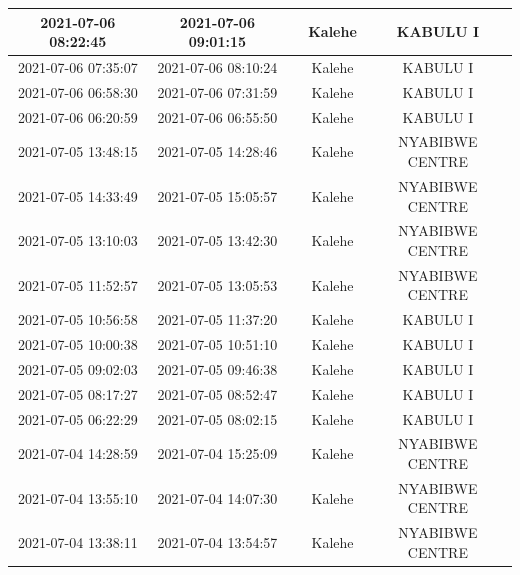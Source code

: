 \documentclass[
]{book}
\begin{document}
\begin{table}
\begin{tabular}[t]{c|c|>{}c|c|c}
\hline
2021-07-06 08:22:45 & 2021-07-06 09:01:15 & \cellcolor[HTML]{365D8D}{\textcolor{white}{39}} & Kalehe & KABULU I\\
\hline
2021-07-06 07:35:07 & 2021-07-06 08:10:24 & \cellcolor[HTML]{1F988B}{\textcolor{white}{35}} & Kalehe & KABULU I\\
\hline
2021-07-06 06:58:30 & 2021-07-06 07:31:59 & \cellcolor[HTML]{277E8E}{\textcolor{white}{33}} & Kalehe & KABULU I\\
\hline
2021-07-06 06:20:59 & 2021-07-06 06:55:50 & \cellcolor[HTML]{218E8D}{\textcolor{white}{35}} & Kalehe & KABULU I\\
\hline
2021-07-05 13:48:15 & 2021-07-05 14:28:46 & \cellcolor[HTML]{FDE725}{\textcolor{white}{41}} & Kalehe & NYABIBWE CENTRE\\
\hline
2021-07-05 14:33:49 & 2021-07-05 15:05:57 & \cellcolor[HTML]{2A788E}{\textcolor{white}{32}} & Kalehe & NYABIBWE CENTRE\\
\hline
2021-07-05 13:10:03 & 2021-07-05 13:42:30 & \cellcolor[HTML]{33628D}{\textcolor{white}{32}} & Kalehe & NYABIBWE CENTRE\\
\hline
2021-07-05 11:52:57 & 2021-07-05 13:05:53 & \cellcolor[HTML]{2C728E}{\textcolor{white}{73}} & Kalehe & NYABIBWE CENTRE\\
\hline
2021-07-05 10:56:58 & 2021-07-05 11:37:20 & \cellcolor[HTML]{433D84}{\textcolor{white}{40}} & Kalehe & KABULU I\\
\hline
2021-07-05 10:00:38 & 2021-07-05 10:51:10 & \cellcolor[HTML]{1F988B}{\textcolor{white}{51}} & Kalehe & KABULU I\\
\hline
2021-07-05 09:02:03 & 2021-07-05 09:46:38 & \cellcolor[HTML]{440154}{\textcolor{white}{45}} & Kalehe & KABULU I\\
\hline
2021-07-05 08:17:27 & 2021-07-05 08:52:47 & \cellcolor[HTML]{414487}{\textcolor{white}{35}} & Kalehe & KABULU I\\
\hline
2021-07-05 06:22:29 & 2021-07-05 08:02:15 & \cellcolor[HTML]{471164}{\textcolor{white}{100}} & Kalehe & KABULU I\\
\hline
2021-07-04 14:28:59 & 2021-07-04 15:25:09 & \cellcolor[HTML]{A5DB36}{\textcolor{white}{56}} & Kalehe & NYABIBWE CENTRE\\
\hline
2021-07-04 13:55:10 & 2021-07-04 14:07:30 & \cellcolor[HTML]{218E8D}{\textcolor{white}{12}} & Kalehe & NYABIBWE CENTRE\\
\hline
2021-07-04 13:38:11 & 2021-07-04 13:54:57 & \cellcolor[HTML]{2C728E}{\textcolor{white}{17}} & Kalehe & NYABIBWE CENTRE\\

\end{tabular}
\end{table}
\end{document}
